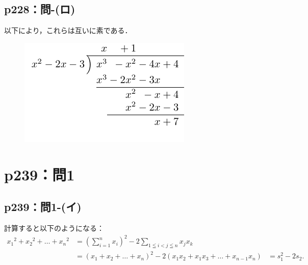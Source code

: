 \documentclass[a4paper,10pt,fleqn]{ltjsarticle}
\begin{document}
\subsection*{p228：問-(ロ)}

以下により，これらは互いに素である．

\begin{figure}[ht]
  \centering
  \includegraphics{emath_figures/p228_toi_ro.pdf}
\end{figure}

\newpage

\section*{p239：問1}

\subsection*{p239：問1-(イ)}


\begin{tleftbar}
  計算すると以下のようになる：
  \begin{align*}
    {x_1}^2 + {x_2}^2+\dots+{x_n}^2 & = \left (\sum_{i=1}^{n} x_i \right )^2 - 2\sum_{1\leqq i < j \leqq n} x_j x_k \\
                                    & = (x_1+x_2+\dots+x_n)^2 - 2(x_1 x_2 + x_1 x_3 + \dots + x_{n-1} x_n)
                                    & = s_1^2 - 2s_2.
  \end{align*}
\end{tleftbar}
\end{document}
